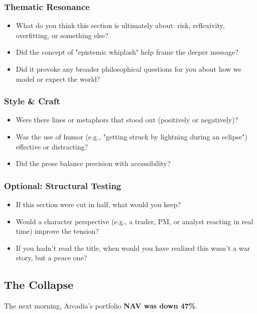 \subsubsection{Thematic Resonance}
\begin{itemize}
  \item What do you think this section is ultimately about: risk, reflexivity, overfitting, or something else?
  \item Did the concept of "epistemic whiplash" help frame the deeper message?
  \item Did it provoke any broader philosophical questions for you about how we model or expect the world?
\end{itemize}

\subsubsection{Style \& Craft}
\begin{itemize}
  \item Were there lines or metaphors that stood out (positively or negatively)?
  \item Was the use of humor (e.g., "getting struck by lightning during an eclipse") effective or distracting?
  \item Did the prose balance precision with accessibility?
\end{itemize}

\subsubsection{Optional: Structural Testing}
\begin{itemize}
  \item If this section were cut in half, what would you keep?
  \item Would a character perspective (e.g., a trader, PM, or analyst reacting in real time) improve the tension?
  \item If you hadn’t read the title, when would you have realized this wasn’t a war story, but a peace one?
\end{itemize}




\subsection{The Collapse}

The next morning, Arcadia’s portfolio \textbf{NAV was down 47\%}.

